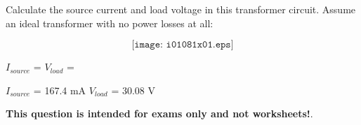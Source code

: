 

Calculate the source current and load voltage in this transformer circuit.  Assume an ideal transformer with no power losses at all:

$$\texttt{[image: i01081x01.eps]}$$

$I_{source}$ = \hskip 80pt $V_{load}$ =

\vskip 10pt







$I_{source}$ = 167.4 mA \hskip 80pt $V_{load}$ = 30.08 V







{\bf This question is intended for exams only and not worksheets!}.



